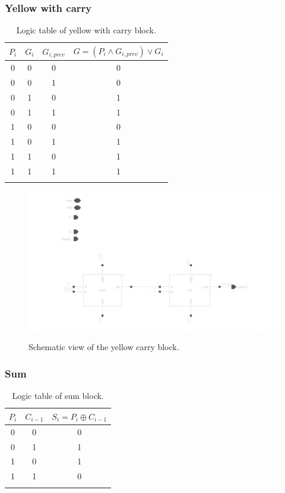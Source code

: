 \subsubsection{Yellow with carry}

\begin{table}[H]
  \caption{Logic table of yellow with carry block.}
  \centering
  \begin{tabular}{ccc|c}
    \toprule
    $P_i$ & $G_i$ & $G_{i,prev}$ & $G=(P_i \wedge G_{i,prev}) \vee G_i$  \\
    \midrule
    0 & 0 & 0 & 0 \\
    0 & 0 & 1 & 0 \\
    0 & 1 & 0 & 1 \\
    0 & 1 & 1 & 1 \\
    1 & 0 & 0 & 0 \\
    1 & 0 & 1 & 1 \\
    1 & 1 & 0 & 1 \\
    1 & 1 & 1 & 1 \\
    \bottomrule
    \label{tab:yellowcarry}
  \end{tabular}
\end{table}

\begin{figure}[H]
  \centering
  \captionsetup{justification=centering}
  {\includegraphics[width=1.0\textwidth]{../figures/yellow_carry}}
  \caption{Schematic view of the yellow carry block.} \label{fig:yellow_c}
\end{figure}

\subsubsection{Sum}

\begin{table}[H]
  \caption{Logic table of sum block.}
  \centering
  \begin{tabular}{cc|c}
    \toprule
    $P_i$ & $C_{i-1}$ & $S_i=P_i \oplus C_{i-1}$ \\
    \midrule
    0 & 0 & 0 \\
    0 & 1 & 1 \\
    1 & 0 & 1 \\
    1 & 1 & 0 \\
    \bottomrule
    \label{tab:sum}
  \end{tabular}
\end{table}

